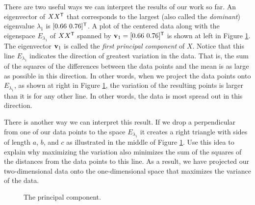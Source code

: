 \begin{pactivity} \label{act:PCA_max_min} There are two useful ways we can interpret the results of our work so far. An eigenvector of $XX^{\mathsf{T}}$ that corresponds to the largest (also called the \emph{dominant}) eigenvalue $\lambda_1$ is  $[0.66 \ 0.76]^{\mathsf{T}}$. A plot of the centered data along with the eigenspace $E_{\lambda_1}$ of $XX^{\mathsf{T}}$ spanned by $\mathbf{v}_1 = [0.66 \ 0.76]^{\mathsf{T}}$ is shown at left in Figure \ref{F:PCA_pc}. The eigenvector $\mathbf{v}_1$ is called the \emph{first principal component} of $X$. Notice that this line $E_{\lambda_1}$ indicates the direction of greatest variation in the data.  That is, the sum of the squares of the differences between the data points and the mean is as large as possible in this direction. In other words, when we project the data points onto $E_{\lambda_1}$, as shown at right in Figure \ref{F:PCA_pc}, the variation of the resulting points is larger than it is for any other line. In other words, the data is most spread out in this direction.
\ba
\item There is another way we can interpret this result. If we drop a perpendicular from one of our data points to the space  $E_{\lambda_1}$ it creates a right triangle with sides of length $a$, $b$, and $c$ as illustrated in the middle of Figure \ref{F:PCA_pc}. Use this idea to explain why maximizing the variation also minimizes the sum of the squares of the distances from the data points to this line. As a result, we have projected our two-dimensional data onto the one-dimensional space that maximizes the variance of the data. 

\begin{figure}[ht]
  \begin{center}
    \caption{The principal component.}
    \label{F:PCA_pc}
  \end{center}
\end{figure}


\end{pactivity}
